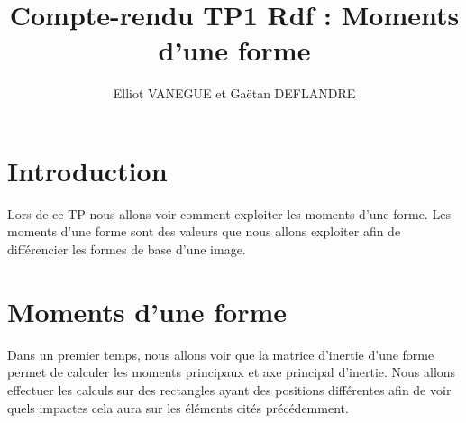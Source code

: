 \documentclass{article}
\title{Compte-rendu TP1 Rdf : Moments d'une forme}
\author{Elliot VANEGUE et Gaëtan DEFLANDRE}
\begin{document}


  \maketitle
  
  \mbox{}
  \newpage
  \clearpage
  
  \section{Introduction}
  Lors de ce TP nous allons voir comment exploiter les moments d'une forme. Les moments
  d'une forme sont des valeurs que nous allons exploiter afin de différencier les formes
  de base d'une image.
  
  \section{Moments d'une forme}
  Dans un premier temps, nous allons voir que la matrice d'inertie d'une forme permet de calculer 
  les moments principaux et axe principal d'inertie. Nous allons effectuer les calculs sur des 
  rectangles ayant des positions différentes afin de voir quels impactes cela aura sur les 
  éléments cités précédemment.\\
  
\end{document}
